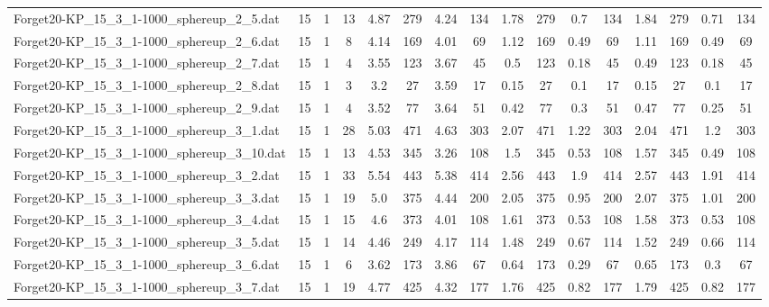 \begin{sidewaystable}[!ht]
{\begin{tabular}{lccccccccccccccc}
Forget20-KP\_15\_3\_1-1000\_sphereup\_2\_5.dat & 15 & 1 & 13 & 4.87 & 279 & 4.24 & 134 & 1.78 & 279 &  \textcolor{blue2}{0.7} & 134 & 1.84 & 279 & 0.71 & 134 \\
Forget20-KP\_15\_3\_1-1000\_sphereup\_2\_6.dat & 15 & 1 & 8 & 4.14 & 169 & 4.01 & 69 & 1.12 & 169 &  \textcolor{blue2}{0.49} & 69 & 1.11 & 169 &  \textcolor{blue2}{0.49} & 69 \\
Forget20-KP\_15\_3\_1-1000\_sphereup\_2\_7.dat & 15 & 1 & 4 & 3.55 & 123 & 3.67 & 45 & 0.5 & 123 &  \textcolor{blue2}{0.18} & 45 & 0.49 & 123 &  \textcolor{blue2}{0.18} & 45 \\
Forget20-KP\_15\_3\_1-1000\_sphereup\_2\_8.dat & 15 & 1 & 3 & 3.2 & 27 & 3.59 & 17 & 0.15 & 27 &  \textcolor{blue2}{0.1} & 17 & 0.15 & 27 &  \textcolor{blue2}{0.1} & 17 \\
Forget20-KP\_15\_3\_1-1000\_sphereup\_2\_9.dat & 15 & 1 & 4 & 3.52 & 77 & 3.64 & 51 & 0.42 & 77 & 0.3 & 51 & 0.47 & 77 &  \textcolor{blue2}{0.25} & 51 \\
Forget20-KP\_15\_3\_1-1000\_sphereup\_3\_1.dat & 15 & 1 & 28 & 5.03 & 471 & 4.63 & 303 & 2.07 & 471 & 1.22 & 303 & 2.04 & 471 & 1.2 & 303 \\
Forget20-KP\_15\_3\_1-1000\_sphereup\_3\_10.dat & 15 & 1 & 13 & 4.53 & 345 & 3.26 & 108 & 1.5 & 345 & 0.53 & 108 & 1.57 & 345 &  \textcolor{blue2}{0.49} & 108 \\
Forget20-KP\_15\_3\_1-1000\_sphereup\_3\_2.dat & 15 & 1 & 33 & 5.54 & 443 & 5.38 & 414 & 2.56 & 443 & 1.9 & 414 & 2.57 & 443 & 1.91 & 414 \\
Forget20-KP\_15\_3\_1-1000\_sphereup\_3\_3.dat & 15 & 1 & 19 & 5.0 & 375 & 4.44 & 200 & 2.05 & 375 &  \textcolor{blue2}{0.95} & 200 & 2.07 & 375 & 1.01 & 200 \\
Forget20-KP\_15\_3\_1-1000\_sphereup\_3\_4.dat & 15 & 1 & 15 & 4.6 & 373 & 4.01 & 108 & 1.61 & 373 &  \textcolor{blue2}{0.53} & 108 & 1.58 & 373 &  \textcolor{blue2}{0.53} & 108 \\
Forget20-KP\_15\_3\_1-1000\_sphereup\_3\_5.dat & 15 & 1 & 14 & 4.46 & 249 & 4.17 & 114 & 1.48 & 249 & 0.67 & 114 & 1.52 & 249 &  \textcolor{blue2}{0.66} & 114 \\
Forget20-KP\_15\_3\_1-1000\_sphereup\_3\_6.dat & 15 & 1 & 6 & 3.62 & 173 & 3.86 & 67 & 0.64 & 173 &  \textcolor{blue2}{0.29} & 67 & 0.65 & 173 & 0.3 & 67 \\
Forget20-KP\_15\_3\_1-1000\_sphereup\_3\_7.dat & 15 & 1 & 19 & 4.77 & 425 & 4.32 & 177 & 1.76 & 425 & 0.82 & 177 & 1.79 & 425 & 0.82 & 177 \\

\end{tabular}}
\end{sidewaystable}
